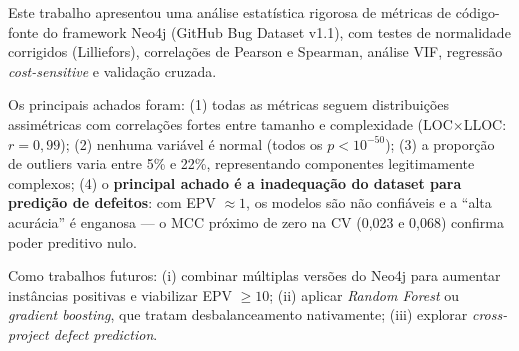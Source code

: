 \documentclass[12pt]{article}
\begin{document}
Este trabalho apresentou uma análise estatística rigorosa de métricas de código-fonte do framework Neo4j (GitHub Bug Dataset v1.1), com testes de normalidade corrigidos (Lilliefors), correlações de Pearson e Spearman, análise VIF, regressão \textit{cost-sensitive} e validação cruzada.

Os principais achados foram: (1) todas as métricas seguem distribuições assimétricas com correlações fortes entre tamanho e complexidade (LOC$\times$LLOC: $r = 0{,}99$); (2) nenhuma variável é normal (todos os $p < 10^{-50}$); (3) a proporção de outliers varia entre 5\% e 22\%, representando componentes legitimamente complexos; (4) o \textbf{principal achado é a inadequação do dataset para predição de defeitos}: com EPV $\approx 1$, os modelos são não confiáveis e a ``alta acurácia'' é enganosa --- o MCC próximo de zero na CV (0,023 e 0,068) confirma poder preditivo nulo.

Como trabalhos futuros: (i) combinar múltiplas versões do Neo4j para aumentar instâncias positivas e viabilizar EPV $\geq 10$; (ii) aplicar \textit{Random Forest} ou \textit{gradient boosting}, que tratam desbalanceamento nativamente; (iii) explorar \textit{cross-project defect prediction}.



\end{document}
